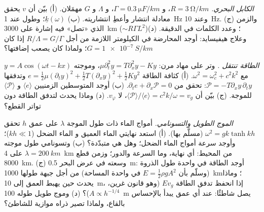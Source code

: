 \begin{exercise}[$\star\star$]\label{exo:b2:dispersion-wave-packets:9}
\emph{الكابل البحري.} $R = \qty{3}{\ohm/km}$، و $\Gamma = \qty{0.3}{\micro F/km}$،
و $\Lambda$ و $G$ مهمَلان. (أ) بيّن أن $v$ يحقق معادلة انتشار وأعطِ
انتشاريته. (ب)  $\underline k(\omega)$؛  وطول  عند \qty{1}{Hz} وعند \qty{10}{Hz}. (ج)
والزمن الذي «تصل» فيه إشارة على \qty{3000}{km} ($\sim R\Gamma L^2$)؛ وعدد الكلمات في
الدقيقة. (د) وعلاج هيفيسايد: أوجد المحارضة في الكيلومتر اللازمة من أجل
$R/\Lambda = G/\Gamma$ إذا كان $G = \qty{1e-7}{S/km}$؛ ولماذا كان يصعب إضافتها؟
\end{exercise}

\begin{exercise}[$\star\star\star$]\label{exo:b2:dispersion-wave-packets:10}
\emph{الطاقة تنتقل .} وتر على مهاد مرن:
$\mu\partial_t^2y = T\partial_x^2y - Ky$، وموجته $y = A\cos(\omega t - kx)$ مع $\omega^2 =
\omega_c^2 + c^2k^2$. (أ) كثافة الطاقة $e = \tfrac12\mu(\partial_ty)^2 + \tfrac12T
(\partial_xy)^2 + \tfrac12Ky^2$ وتدفقها $\mathcal P = -T\partial_xy\,\partial_ty$: تحقق من
$\partial_te + \partial_x\mathcal P = 0$. (ب) أوجد المتوسطين الزمنيين $\langle e\rangle$ و
$\langle\mathcal P\rangle$ للموجة. (ج) بيّن أن $\langle\mathcal P\rangle/
\langle e\rangle = c^2k/\omega = v_g$، لا $v_\varphi$. (د) وماذا يحدث لتدفق
الطاقة دون تواتر القطع؟
\end{exercise}

\begin{exercise}[$\star\star\star$]\label{exo:b2:dispersion-wave-packets:11}
\emph{الموج الطويل والتسونامي.} أمواج الماء ذات طول الموجة $\lambda$ على عمق $h$
تحقق $\omega^2 = gk\tanh kh$ (مسلَّم بها). (أ) استعد نهايتي الماء العميق و
الماء الضحل ($kh \ll 1$)؛ وأوجد سرعة أمواج الماء الضحل؛ وهل هي
متبدّدة؟ (ب) وتسونامي طول موجته $\lambda = \qty{200}{km}$ على \qty{4}{km} من المحيط:
أي نهاية، وما السرعة والدور؛ وزمن قطع \qty{8000}{km}. (ج) وسعته
في عرض البحر \qty{0.5}{m}: أوجد الطاقة في واحدة طول الذروة
(وسلّم بأن $E = \tfrac12\rho gA^2$ في واحدة المساحة) من أجل جبهة طولها \qty{1000}{km}؛ وماذا
يحدث حين يهبط العمق إلى \qty{10}{m}، إذا انحفظ تدفق الطاقة $Ev_g$
(وهو قانون غرين، $A \propto h^{-1/4}$)؟ (د) وموج طويل طوله \qty{100}{m}
يصل شاطئًا: عند أي عمق يبدأ بالإحساس بالقاع،
ولماذا تصير ذراه موازية للشاطئ؟
\end{exercise}

